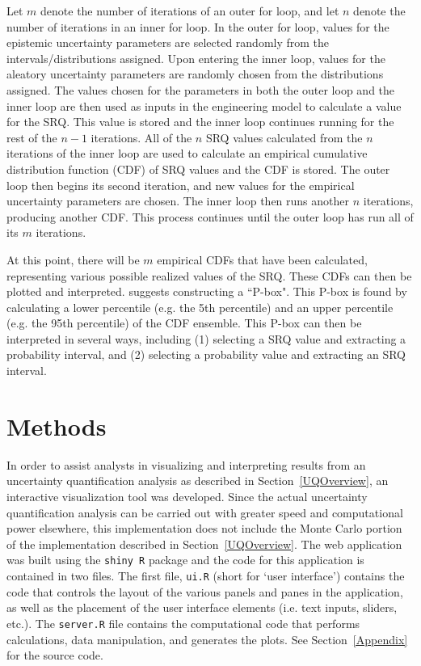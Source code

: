\documentclass[11pt]{asaproc}\usepackage[]{graphicx}\usepackage[]{color}
\begin{document}
Let $m$ denote the number of iterations of an outer for loop, and let $n$ denote the number of iterations in an inner for loop. In the outer for loop, values for the epistemic uncertainty parameters are selected randomly from the intervals/distributions assigned. Upon entering the inner loop, values for the aleatory uncertainty parameters are randomly chosen from the distributions assigned. The values chosen for the parameters in both the outer loop and the inner loop are then used as inputs in the engineering model to calculate a value for the SRQ. This value is stored and the inner loop continues running for the rest of the $n-1$ iterations. All of the $n$ SRQ values calculated from the $n$ iterations of the inner loop are used to calculate an empirical cumulative distribution function (CDF) of SRQ values and the CDF is stored. The outer loop then begins its second iteration, and new values for the empirical uncertainty parameters are chosen. The inner loop then runs another $n$ iterations, producing another CDF. This process continues until the outer loop has run all of its $m$ iterations. 

At this point, there will be $m$ empirical CDFs that have been calculated, representing various possible realized values of the SRQ. These CDFs can then be plotted and interpreted. \cite{EW2018} suggests constructing a ``P-box". This P-box is found by calculating a lower percentile (e.g. the 5th percentile) and an upper percentile (e.g. the 95th percentile) of the CDF ensemble. This P-box can then be interpreted in several ways, including (1) selecting a SRQ value and extracting a probability interval, and (2) selecting a probability value and extracting an SRQ interval.

\section{Methods}  
\label{Methods}

In order to assist analysts in visualizing and interpreting results from an uncertainty quantification analysis as described in Section~\ref{UQOverview}, an interactive visualization tool was developed. Since the actual uncertainty quantification analysis can be carried out with greater speed and computational power elsewhere, this implementation does not include the Monte Carlo portion of the implementation described in Section~\ref{UQOverview}. The web application was built using the {\tt shiny R} package and the code for this application is contained in two files. The first file, {\tt ui.R} (short for `user interface') contains the code that controls the layout of the various panels and panes in the application, as well as the placement of the user interface elements (i.e. text inputs, sliders, etc.). The {\tt server.R} file contains the computational code that performs calculations, data manipulation, and generates the plots. See Section~\ref{Appendix} for the source code. 
\end{document}
